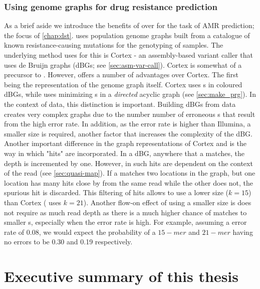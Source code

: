 \subsubsection{Using genome graphs for drug resistance prediction}
\label{sec:genome-graphs-dst}
As a brief aside we introduce the benefits of \pandora{} over \mykrobe{} for the task of AMR prediction; the focus of \autoref{chap:dst}. \mykrobe{} uses population genome graphs built from a catalogue of known resistance-causing mutations for the genotyping of samples. The underlying method \mykrobe{} uses for this is Cortex \cite{iqbal2012} - an assembly-based variant caller that uses de Bruijn graphs (dBGs; see \autoref{sec:asm-var-call}). Cortex is somewhat of a precursor to \pandora{}. However, \pandora{} offers a number of advantages over Cortex. The first being the representation of the genome graph itself. Cortex uses \kmer{}s in coloured dBGs, while \pandora{} uses minimizing \kmer{}s in a \emph{directed} acyclic graph (see \autoref{sec:make_prg}). In the context of \ont{} data, this distinction is important. Building dBGs from \ont{} data creates very complex graphs due to the number number of erroneous \kmer{}s that result from the high error rate. In addition, as the \ont{} error rate is higher than Illumina, a smaller \kmer{} size is required, another factor that increases the complexity of the dBG. Another important difference in the graph representations of Cortex and \pandora{} is the way in which \kmer{} "hits" are incorporated. In a dBG, anywhere that a \kmer{} matches, the depth is incremented by one. However, in \pandora{} such hits are dependent on the context of the read (see \autoref{sec:quasi-map}). If a \kmer{} matches two locations in the graph, but one location has many hits close by from the same read while the other does not, the spurious hit is discarded. This filtering of \kmer{} hits allows \pandora{} to use a lower \kmer{} size ($k=15$) than Cortex (\mykrobe{} uses $k=21$). Another flow-on effect of using a smaller \kmer{} size is \pandora{} does not require as much read depth as there is a much higher chance of matches to smaller \kmer{}s, especially when the error rate is high. For example, assuming a \ont{} error rate of 0.08, we would expect the probability of a $15-mer$ and $21-mer$ having no errors to be 0.30 and 0.19 respectively.


\section{Executive summary of this thesis}


